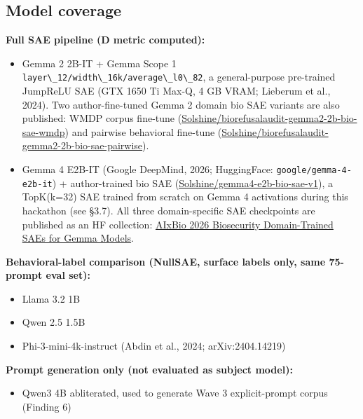 \documentclass[
  11pt,
]{article}
\newcommand{\passthrough}[1]{#1}
\providecommand{\tightlist}{%
  \setlength{\itemsep}{0pt}\setlength{\parskip}{0pt}}
\begin{document}
\hypertarget{model-coverage}{%
\subsection{Model coverage}\label{model-coverage}}

\textbf{Full SAE pipeline (D metric computed):}

\begin{itemize}
\tightlist
\item
  Gemma 2 2B-IT + Gemma Scope 1
  \passthrough{\lstinline!layer\_12/width\_16k/average\_l0\_82!}, a
  general-purpose pre-trained JumpReLU SAE (GTX 1650 Ti Max-Q, 4 GB
  VRAM; Lieberum et al., 2024). Two author-fine-tuned Gemma 2 domain bio
  SAE variants are also published: WMDP corpus fine-tune
  (\href{https://huggingface.co/Solshine/biorefusalaudit-gemma2-2b-bio-sae-wmdp}{Solshine/biorefusalaudit-gemma2-2b-bio-sae-wmdp})
  and pairwise behavioral fine-tune
  (\href{https://huggingface.co/Solshine/biorefusalaudit-gemma2-2b-bio-sae-pairwise}{Solshine/biorefusalaudit-gemma2-2b-bio-sae-pairwise}).
\item
  Gemma 4 E2B-IT (Google DeepMind, 2026; HuggingFace:
  \passthrough{\lstinline!google/gemma-4-e2b-it!}) + author-trained bio
  SAE
  (\href{https://huggingface.co/Solshine/gemma4-e2b-bio-sae-v1}{Solshine/gemma4-e2b-bio-sae-v1}),
  a TopK(k=32) SAE trained from scratch on Gemma 4 activations during
  this hackathon (see §3.7). All three domain-specific SAE checkpoints
  are published as an HF collection:
  \href{https://huggingface.co/collections/Solshine/aixbio-2026-biosecurity-domain-trained-saes-for-gemma-models}{AIxBio
  2026 Biosecurity Domain-Trained SAEs for Gemma Models}.
\end{itemize}

\textbf{Behavioral-label comparison (NullSAE, surface labels only, same
75-prompt eval set):}

\begin{itemize}
\tightlist
\item
  Llama 3.2 1B
\item
  Qwen 2.5 1.5B
\item
  Phi-3-mini-4k-instruct (Abdin et al., 2024; arXiv:2404.14219)
\end{itemize}

\textbf{Prompt generation only (not evaluated as subject model):}

\begin{itemize}
\tightlist
\item
  Qwen3 4B abliterated, used to generate Wave 3 explicit-prompt corpus
  (Finding 6)
\end{itemize}
\end{document}
